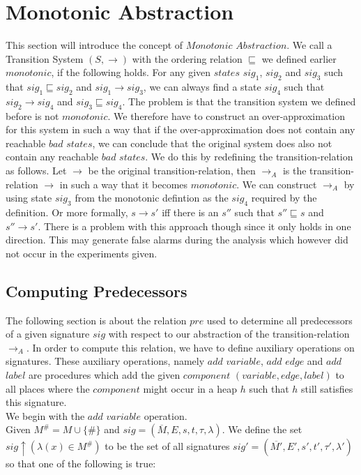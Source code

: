 \section{Monotonic Abstraction}
This section will introduce the concept of $Monotonic$ $Abstraction$. We call a Transition System $(S, \longrightarrow)$ with
the ordering relation $\sqsubseteq$ we defined earlier $monotonic$, if the following holds. For any given $states$ $sig_1$, $sig_2$
and $sig_3$ such that $sig_1 \sqsubseteq sig_2$ and $sig_1 \longrightarrow sig_3$, we can always find a state $sig_4$ such that
$sig_2 \longrightarrow sig_4$ and $sig_3 \sqsubseteq sig_4$.
The problem is that the transition system we defined before is not $monotonic$. We therefore have to construct an over-approximation
for this system in such a way that if the over-approximation does not contain any reachable $bad$ $states$, we can conclude that
the original system does also not contain any reachable $bad$ $states$. We do this by redefining the transition-relation as follows.
Let $\longrightarrow$ be the original transition-relation, then $\longrightarrow_A$ is the transition-relation $\longrightarrow$
in such a way that it becomes $monotonic$. We can construct $\longrightarrow_A$ by using state $sig_3$ from the monotonic defintion
as the $sig_4$ required by the definition. Or more formally, $s \longrightarrow s'$ iff there is an $s''$ such that $s'' \sqsubseteq s$
and $s'' \longrightarrow s'$. There is a problem with this approach though since it only holds in one direction. 
This may generate false alarms during the analysis which however did not occur in the experiments given. 

\subsection{Computing Predecessors}
The following section is about the relation $pre$ used to determine all predecessors of a given signature $sig$ with respect to
our abstraction of the transition-relation $\longrightarrow_A$. In order to compute this relation, we have to define auxiliary 
operations on signatures. These auxiliary operations, namely $add$ $variable$, $add$ $edge$ and $add$ $label$ are procedures
which add the given $component$ $(variable, edge, label)$ to all places where the $component$ might occur in a heap $h$ such that
$h$ still satisfies this signature. \\
We begin with the $add$ $variable$ operation.\\
Given $M^{\#} = M \cup \{\#\}$ and $sig = (\overline{M}, E, s, t, \tau, \lambda)$. We define the set 
$sig \uparrow(\lambda(x) \in M^{\#})$ to be the set of all signatures $sig'=(\overline{M'}, E', s', t', \tau', \lambda')$ 
so that one of the following is true:

